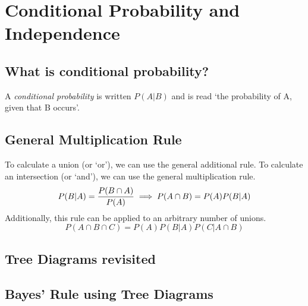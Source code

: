     \section{Conditional Probability and Independence}  %
        \subsection{What is conditional probability?}  %
            A \emph{conditional probability} is written $P(A\vert B)$ and is read `the probability of A, given that B occurs'.

        \subsection{General Multiplication Rule}  %
            To calculate a union (or `or'), we can use the general additional rule. To calculate an intersection (or `and'), we can use the general multiplication rule.
            \begin{equation}
                P(B\vert A)=\frac{P(B\cap A)}{P(A)} \implies P(A\cap B) = P(A)P(B\vert A) \\
            \end{equation}
            Additionally, this rule can be applied to an arbitrary number of unions.
            \begin{equation}
                P(A\cap B\cap C)=P(A)P(B\vert A)P(C\vert A\cap B)
            \end{equation}
        \subsection{Tree Diagrams revisited}  %
        \subsection{Bayes' Rule using Tree Diagrams}  %
